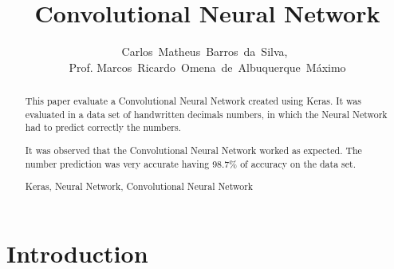 \documentclass[journal]{IEEEtran}
\begin{document}
    \title{Convolutional Neural Network}
  \author{Carlos~Matheus~Barros~da~Silva,~\\Prof. Marcos~Ricardo~Omena~de~Albuquerque~Máximo}


\maketitle



\begin{abstract}

This paper evaluate a Convolutional Neural Network created using Keras. It was evaluated in a data set of handwritten decimals numbers, in which the Neural Network had to predict correctly the numbers.

It was observed that the Convolutional Neural Network worked as expected. The number prediction was very accurate having 98.7\% of accuracy on the data set.

\begin{IEEEkeywords}
    Keras, Neural Network, Convolutional Neural Network
\end{IEEEkeywords}
\end{abstract}

\IEEEpeerreviewmaketitle



\section{Introduction}
\end{document}
